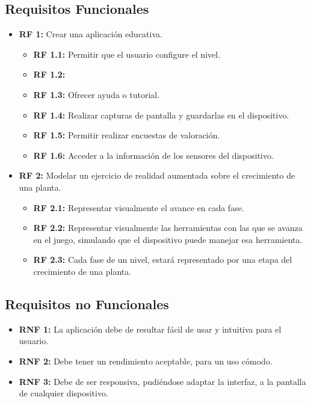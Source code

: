 \subsection{Requisitos Funcionales}
 \begin{itemize}
	\item \textbf{RF 1:} Crear una aplicación educativa.
	\begin{itemize}
	\item \textbf{RF 1.1:} Permitir que el usuario configure el nivel.
	\item \textbf{RF 1.2:} 
	\item \textbf{RF 1.3:} Ofrecer ayuda o tutorial.	
	\item \textbf{RF 1.4:} Realizar capturas de pantalla y guardarlas en el dispositivo.
	\item \textbf{RF 1.5:} Permitir realizar encuestas de valoración.
	\item \textbf{RF 1.6:} Acceder a la información de los sensores del dispositivo.
	
	\end{itemize} 
	\item \textbf{RF 2:} Modelar un ejercicio de realidad aumentada sobre el crecimiento de una planta.
	\begin{itemize}
	\item \textbf{RF 2.1:} Representar visualmente el avance en cada fase.
	\item \textbf{RF 2.2:} Representar visualmente las herramientas con las que se avanza en el juego, simulando que el dispositivo puede manejar esa herramienta.
	\item \textbf{RF 2.3:} Cada fase de un nivel, estará representado por una etapa del crecimiento de una planta.
	
	\end{itemize} 
	
	
\end{itemize}
\subsection{Requisitos no Funcionales}
\begin{itemize}
	\item \textbf{RNF 1:} La aplicación debe de resultar fácil de usar y intuitiva para el usuario.
	\item \textbf{RNF 2:} Debe tener un rendimiento aceptable, para un uso cómodo.
	\item \textbf{RNF 3:} Debe de ser responsiva, pudiéndose adaptar la interfaz, a la pantalla de cualquier dispositivo.
\end{itemize}
